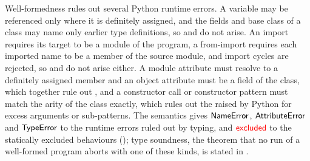 Well-formedness rules out several Python runtime errors. A variable may be referenced only where it is
definitely assigned, and the fields and base class of a class may name only earlier type definitions, so
 and  do not arise. An import requires its target to be a module
of the program, a from-import requires each imported name to be a member of the source module, and import
cycles are rejected, so  and  do not arise either. A module
attribute must resolve to a definitely assigned member and an object attribute must be a field of the class, which together rule out ,
and a constructor call or constructor pattern must match the arity of the class exactly, which rules out the
 raised by Python for excess arguments or sub-patterns. The semantics gives $\mathsf{NameError}$,
$\mathsf{AttributeError}$ and $\mathsf{TypeError}$ to the runtime errors ruled out by typing, and $\textcolor{red}{\mathsf{excluded}}$ to the statically excluded
behaviours (); type soundness, the theorem that no run of a well-formed program aborts with
one of these kinds, is stated in .

